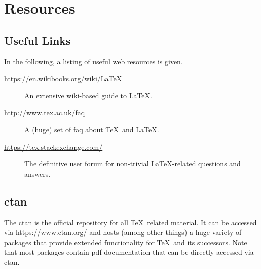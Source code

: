 \section{Resources}

\subsection{Useful Links}

In the following, a listing of useful web resources is given.
\begin{description}
    \item[\url{https://en.wikibooks.org/wiki/LaTeX}] An extensive wiki-based guide to \LaTeX.
    \item[\url{http://www.tex.ac.uk/faq}] A (huge) set of \gls{faq} about \TeX\ and \LaTeX.
    \item[\url{https://tex.stackexchange.com/}] The definitive user forum for non-trivial \LaTeX-related questions and answers.
\end{description}

\subsection[Comprehensive TeX Archive Network]{\gls{ctan}}

The \gls{ctan} is the official repository for all \TeX\ related material.
It can be accessed via \url{https://www.ctan.org/} and hosts (among other things) a huge variety of packages that provide extended functionality for \TeX\ and its successors.
Note that most packages contain \gls{pdf} documentation that can be directly accessed via \gls{ctan}.

